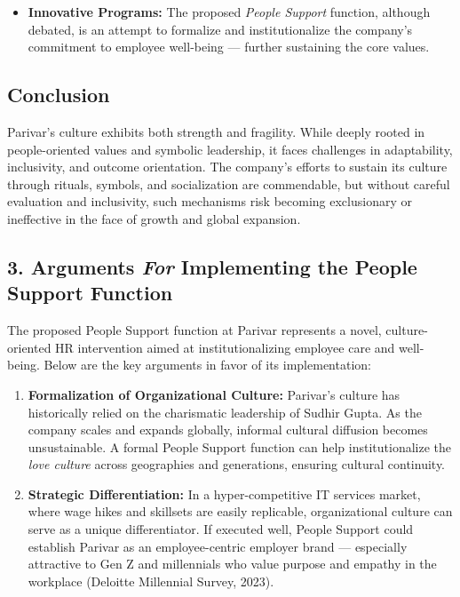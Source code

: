 \documentclass[10pt,a4paper]{book}
\begin{document}
\begin{multicols}{2}
\begin{itemize}
    \item \textbf{Innovative Programs:} The proposed \textit{People Support} function, although debated, is an attempt to formalize and institutionalize the company’s commitment to employee well-being — further sustaining the core values.
\end{itemize}

\subsection*{Conclusion}

Parivar's culture exhibits both strength and fragility. While deeply rooted in people-oriented values and symbolic leadership, it faces challenges in adaptability, inclusivity, and outcome orientation. The company’s efforts to sustain its culture through rituals, symbols, and socialization are commendable, but without careful evaluation and inclusivity, such mechanisms risk becoming exclusionary or ineffective in the face of growth and global expansion.

\subsection*{3. Arguments \textit{For} Implementing the People Support Function}

The proposed People Support function at Parivar represents a novel, culture-oriented HR intervention aimed at institutionalizing employee care and well-being. Below are the key arguments in favor of its implementation:

\begin{enumerate}
    \item \textbf{Formalization of Organizational Culture:} Parivar’s culture has historically relied on the charismatic leadership of Sudhir Gupta. As the company scales and expands globally, informal cultural diffusion becomes unsustainable. A formal People Support function can help institutionalize the \textit{love culture} across geographies and generations, ensuring cultural continuity.

    \item \textbf{Strategic Differentiation:} In a hyper-competitive IT services market, where wage hikes and skillsets are easily replicable, organizational culture can serve as a unique differentiator. If executed well, People Support could establish Parivar as an employee-centric employer brand — especially attractive to Gen Z and millennials who value purpose and empathy in the workplace (Deloitte Millennial Survey, 2023).


\end{enumerate}
\end{multicols}
\end{document}
